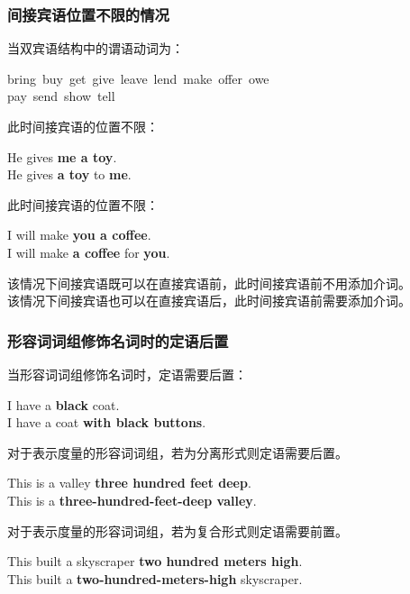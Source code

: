 \documentclass[UTF8]{ctexart}
\begin{document}
\subsubsection{间接宾语位置不限的情况}
    当双宾语结构中的谓语动词为：
    \begin{center}
        \ttfamily
        bring~buy~get~give~leave~lend~make~offer~owe\\[3mm]
        pay~send~show~tell
    \end{center}\vspace{10pt}
    此时间接宾语的位置不限：
    \begin{center}
        \large
        \ttfamily
        He gives \textbf{me a toy}.\\[3mm]
        He gives \textbf{a toy} to \textbf{me}.\\[3mm]
    \end{center}
    此时间接宾语的位置不限：
    \begin{center}
        \large
        \ttfamily
        I will make \textbf{you a coffee}.\\[3mm]
        I will make \textbf{a coffee} for \textbf{you}.\\[3mm]
    \end{center}
    该情况下间接宾语既可以在直接宾语前，此时间接宾语前不用添加介词。\\[3mm]
    该情况下间接宾语也可以在直接宾语后，此时间接宾语前需要添加介词。

\newpage

\subsubsection{形容词词组修饰名词时的定语后置}
    当形容词词组修饰名词时，定语需要后置：
    \begin{center}
        \large
        \ttfamily
        I have a \textbf{black} coat.\\[3mm]
        I have a coat \textbf{with black buttons}.\\[8mm]
    \end{center}
    对于表示度量的形容词词组，若为分离形式则定语需要后置。
    \begin{center}
        \large
        \ttfamily
        This is a valley \textbf{three hundred feet deep}.\\[3mm]
        This is a \textbf{three-hundred-feet-deep valley}.\\[8mm]
    \end{center}
    对于表示度量的形容词词组，若为复合形式则定语需要前置。
    \begin{center}
        \large
        \ttfamily
        This built a skyscraper \textbf{two hundred meters high}.\\[3mm]
        This built a \textbf{two-hundred-meters-high} skyscraper.
    \end{center}\vspace{15pt}
\end{document}
